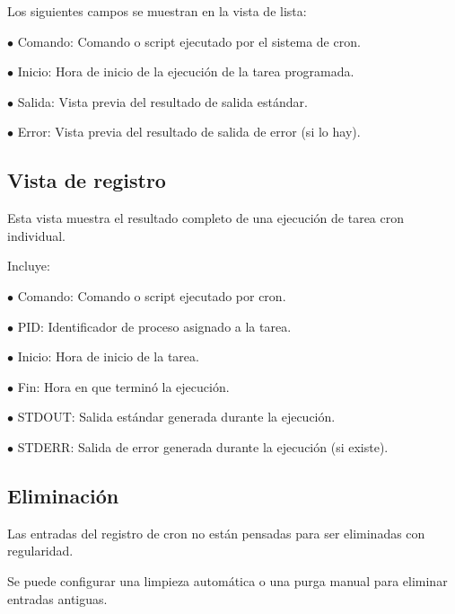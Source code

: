\documentclass[a4paper]{article}
\begin{document}
Los siguientes campos se muestran en la vista de lista:

\begin{compactitem}
\item[\color{myblue}$\bullet$] Comando: Comando o script ejecutado por el sistema de cron.
\item[\color{myblue}$\bullet$] Inicio: Hora de inicio de la ejecución de la tarea programada.
\item[\color{myblue}$\bullet$] Salida: Vista previa del resultado de salida estándar.
\item[\color{myblue}$\bullet$] Error: Vista previa del resultado de salida de error (si lo hay).
\end{compactitem}

\hypertarget{toc14}{}
\subsection{Vista de registro}

Esta vista muestra el resultado completo de una ejecución de tarea cron individual.

Incluye:

\begin{compactitem}
\item[\color{myblue}$\bullet$] Comando: Comando o script ejecutado por cron.
\item[\color{myblue}$\bullet$] PID: Identificador de proceso asignado a la tarea.
\item[\color{myblue}$\bullet$] Inicio: Hora de inicio de la tarea.
\item[\color{myblue}$\bullet$] Fin: Hora en que terminó la ejecución.
\item[\color{myblue}$\bullet$] STDOUT: Salida estándar generada durante la ejecución.
\item[\color{myblue}$\bullet$] STDERR: Salida de error generada durante la ejecución (si existe).
\end{compactitem}

\hypertarget{toc15}{}
\subsection{Eliminación}

Las entradas del registro de cron no están pensadas para ser eliminadas con regularidad.

Se puede configurar una limpieza automática o una purga manual para eliminar entradas antiguas.
\end{document}
